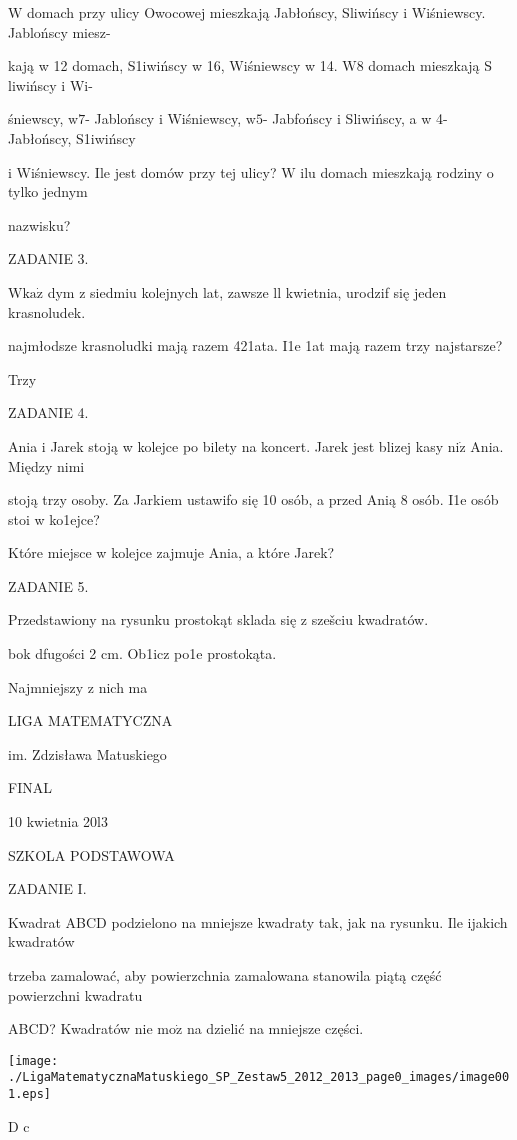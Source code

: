 \documentclass[a4paper,12pt]{article}
\begin{document}
$\mathrm{W}$ domach przy ulicy Owocowej mieszkają Jabłońscy, S$\acute{}$liwińscy i Wiśniewscy. Jablońscy miesz-

kają w 12 domach, S$\acute{}$1iwińscy w 16, Wiśniewscy w 14. $\mathrm{W}8$ domach mieszkają S$\acute{}$liwińscy i Wi-

śniewscy, $\mathrm{w}7$- Jablońscy i Wiśniewscy, $\mathrm{w}5$- Jabfońscy i S$\acute{}$liwińscy, a w 4- Jabłońscy, S$\acute{}$1iwińscy

i Wiśniewscy. Ile jest domów przy tej ulicy? $\mathrm{W}$ ilu domach mieszkają rodziny o tylko jednym

nazwisku?

ZADANIE 3.

$\mathrm{W}\mathrm{k}\mathrm{a}\dot{\mathrm{z}}$ dym z siedmiu kolejnych lat, zawsze ll kwietnia, urodzif się jeden krasnoludek.

najmłodsze krasnoludki mają razem 421ata. I1e 1at mają razem trzy najstarsze?

Trzy

ZADANIE 4.

Ania i Jarek stoją w kolejce po bilety na koncert. Jarek jest blizej kasy $\mathrm{n}\mathrm{i}\dot{\mathrm{z}}$ Ania. Między nimi

stoją trzy osoby. Za Jarkiem ustawifo się 10 osób, a przed Anią 8 osób. I1e osób stoi w ko1ejce?

Które miejsce w kolejce zajmuje Ania, a które Jarek?

ZADANIE 5.

Przedstawiony na rysunku prostokąt sklada się z szešciu kwadratów.

bok dfugości 2 cm. Ob1icz po1e prostokąta.

Najmniejszy z nich ma






LIGA MATEMATYCZNA

im. Zdzisława Matuskiego

FINAL

10 kwietnia 20l3

SZKOLA PODSTAWOWA

ZADANIE I.

Kwadrat ABCD podzielono na mniejsze kwadraty tak, jak na rysunku. Ile ijakich kwadratów

trzeba zamalować, aby powierzchnia zamalowana stanowila piątą część powierzchni kwadratu

ABCD? Kwadratów nie $\mathrm{m}\mathrm{o}\dot{\mathrm{z}}$ na dzielić na mniejsze części.
\begin{center}
\texttt{[image: ./LigaMatematycznaMatuskiego\_SP\_Zestaw5\_2012\_2013\_page0\_images/image001.eps]}
\end{center}
D  c
\end{document}
